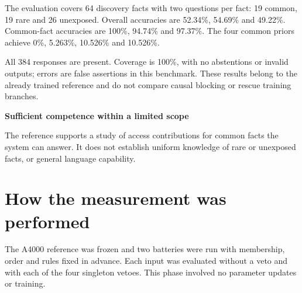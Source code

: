 \documentclass[11pt,a4paper]{article}
\newcommand{\callout}[2]{\par\vspace{3pt}\begingroup\setlength{\fboxsep}{9pt}%
  \colorbox{light}{\begin{minipage}{\dimexpr\linewidth-2\fboxsep\relax}%
  {\sffamily\bfseries\color{ink}#1}\par\small #2\end{minipage}}\endgroup\par\vspace{3pt}}
\newcommand{\pageend}{\clearpage}
\begin{document}
The evaluation covers 64 discovery facts with two questions per fact: 19
common, 19 rare and 26 unexposed. Overall accuracies are 52.34\%, 54.69\% and
49.22\%. Common-fact accuracies are 100\%, 94.74\% and 97.37\%. The four common
priors achieve 0\%, 5.263\%, 10.526\% and 10.526\%.

All 384 responses are present. Coverage is 100\%, with no abstentions or invalid
outputs; errors are false assertions in this benchmark. These results belong
to the already trained reference and do not compare causal blocking or rescue
training branches.

\callout{Sufficient competence within a limited scope}{
The reference supports a study of access contributions for common facts the
system can answer. It does not establish uniform knowledge of rare or unexposed
facts, or general language capability.}

\pageend
\section{How the measurement was performed}
\label{sec:method}

The A4000 reference was frozen and two batteries were run with membership,
order and rules fixed in advance. Each input was evaluated without a veto and
with each of the four singleton vetoes. This phase involved no parameter
updates or training.

\begin{center}
\end{center}
\end{document}
